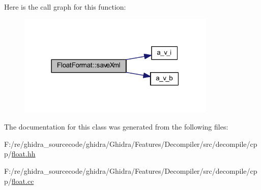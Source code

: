 Here is the call graph for this function\+:
\nopagebreak
\begin{figure}[H]
\begin{center}
\leavevmode
\includegraphics[width=267pt]{class_float_format_adc679e89dcd8c63b0b9cc08f3464ba1a_cgraph}
\end{center}
\end{figure}


The documentation for this class was generated from the following files\+:\begin{DoxyCompactItemize}
\item 
F\+:/re/ghidra\+\_\+sourcecode/ghidra/\+Ghidra/\+Features/\+Decompiler/src/decompile/cpp/\mbox{\hyperlink{float_8hh}{float.\+hh}}\item 
F\+:/re/ghidra\+\_\+sourcecode/ghidra/\+Ghidra/\+Features/\+Decompiler/src/decompile/cpp/\mbox{\hyperlink{float_8cc}{float.\+cc}}\end{DoxyCompactItemize}
